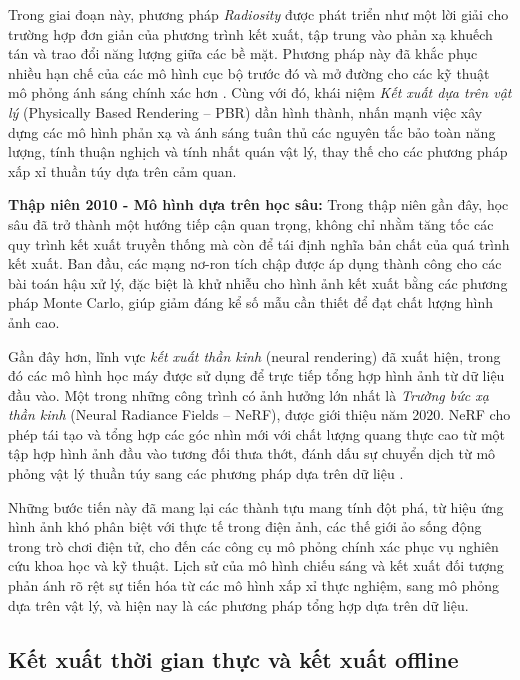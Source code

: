 Trong giai đoạn này, phương pháp \textit{Radiosity} được phát triển như một lời giải cho trường hợp đơn giản của phương trình kết xuất, tập trung vào phản xạ khuếch tán và trao đổi năng lượng giữa các bề mặt. Phương pháp này đã khắc phục nhiều hạn chế của các mô hình cục bộ trước đó và mở đường cho các kỹ thuật mô phỏng ánh sáng chính xác hơn \cite{radiosity1}. Cùng với đó, khái niệm \textit{Kết xuất dựa trên vật lý} (Physically Based Rendering -- PBR) dần hình thành, nhấn mạnh việc xây dựng các mô hình phản xạ và ánh sáng tuân thủ các nguyên tắc bảo toàn năng lượng, tính thuận nghịch và tính nhất quán vật lý, thay thế cho các phương pháp xấp xỉ thuần túy dựa trên cảm quan.

\textbf{Thập niên 2010 - Mô hình dựa trên học sâu:}
Trong thập niên gần đây, học sâu đã trở thành một hướng tiếp cận quan trọng, không chỉ nhằm tăng tốc các quy trình kết xuất truyền thống mà còn để tái định nghĩa bản chất của quá trình kết xuất. Ban đầu, các mạng nơ-ron tích chập được áp dụng thành công cho các bài toán hậu xử lý, đặc biệt là khử nhiễu cho hình ảnh kết xuất bằng các phương pháp Monte Carlo, giúp giảm đáng kể số mẫu cần thiết để đạt chất lượng hình ảnh cao.

Gần đây hơn, lĩnh vực \textit{kết xuất thần kinh} (neural rendering) đã xuất hiện, trong đó các mô hình học máy được sử dụng để trực tiếp tổng hợp hình ảnh từ dữ liệu đầu vào. Một trong những công trình có ảnh hưởng lớn nhất là \textit{Trường bức xạ thần kinh} (Neural Radiance Fields -- NeRF), được giới thiệu năm 2020. NeRF cho phép tái tạo và tổng hợp các góc nhìn mới với chất lượng quang thực cao từ một tập hợp hình ảnh đầu vào tương đối thưa thớt, đánh dấu sự chuyển dịch từ mô phỏng vật lý thuần túy sang các phương pháp dựa trên dữ liệu \cite{nerf_2020}.

Những bước tiến này đã mang lại các thành tựu mang tính đột phá, từ hiệu ứng hình ảnh khó phân biệt với thực tế trong điện ảnh, các thế giới ảo sống động trong trò chơi điện tử, cho đến các công cụ mô phỏng chính xác phục vụ nghiên cứu khoa học và kỹ thuật. Lịch sử của mô hình chiếu sáng và kết xuất đối tượng phản ánh rõ rệt sự tiến hóa từ các mô hình xấp xỉ thực nghiệm, sang mô phỏng dựa trên vật lý, và hiện nay là các phương pháp tổng hợp dựa trên dữ liệu.

\subsection{Kết xuất thời gian thực và kết xuất offline}

